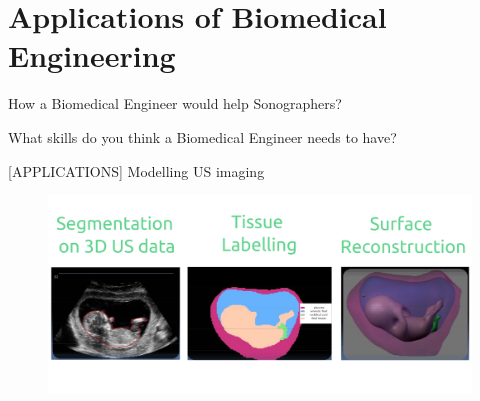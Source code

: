 \section{Applications of Biomedical Engineering}



{
\begin{frame}{}

\BigSizeFont
\begin{center}
    How a Biomedical Engineer would help Sonographers?
\end{center}
\vspace{10mm}
\begin{center}
    What skills do you think a Biomedical Engineer needs to have?
\end{center}

\end{frame}
}


{


\begin{frame}{[\faUserMd APPLICATIONS] Modelling US imaging}
      \begin{figure}
        \centering
        \includegraphics[width=1.0\textwidth]{./../figures/modelling-us-imaging/versions/drawing-v03}
      \end{figure}
\end{frame}
}




%
%


